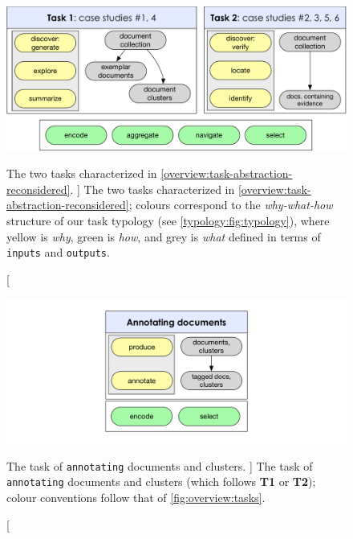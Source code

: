
 \begin{figure}
	\centering
	\includegraphics[width=\textwidth]{figures/overview-tasks}
	\caption
	[
	   The two tasks characterized in \autoref{overview:task-abstraction-reconsidered}.
	]
	{
	   The two tasks characterized in \autoref{overview:task-abstraction-reconsidered}; colours correspond to the {\it why-what-how} structure of our task typology (see \autoref{typology:fig:typology}), where yellow is {\it why}, green is {\it how}, and grey is {\it what} defined in terms of {\tt inputs} and {\tt outputs}.
	}
	\centering
	\label{fig:overview:tasks}
\end{figure}



 \begin{figure}
	\centering
	\includegraphics[width=\textwidth]{figures/overview-tasks-2}
	\caption
	[
	    The task of {\tt annotating} documents and clusters.
	]
	{
	   The task of {\tt annotating} documents and clusters (which follows {\bf T1} or {\bf T2}); colour conventions follow that of \autoref{fig:overview:tasks}.
	}
	\centering
	\label{fig:overview:tasks:annotate}
\end{figure}


\endinput
